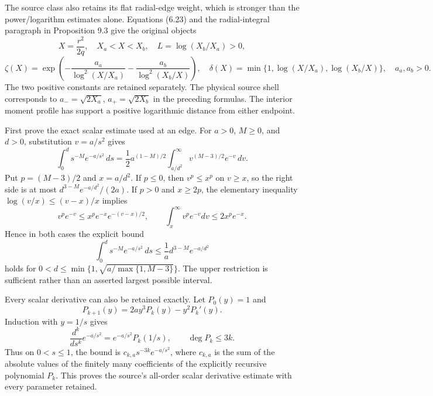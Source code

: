 \documentclass[10pt,a4paper]{article}
\begin{document}
The source class also retains its flat radial-edge weight, which is stronger than the power/logarithm estimates alone. Equations (6.23) and the radial-integral paragraph in Proposition 9.3 give the original objects \[
X=\frac{r^2}{2q},\quad X_a<X<X_b,\quad L=\log(X_b/X_a)>0,
\tag{R43}
\] \[
\zeta(X)=\exp\left(-\frac{a_a}{\log^2(X/X_a)}-\frac{a_b}{\log^2(X_b/X)}\right),
\quad\delta(X)=\min\{1,\log(X/X_a),\log(X_b/X)\},
\quad a_a,a_b>0.
\tag{R44}
\] The two positive constants are retained separately. The physical source shell corresponds to \(a_-=\sqrt{2X_a}\), \(a_+=\sqrt{2X_b}\) in the preceding formulas. The interior moment profile has support a positive logarithmic distance from either endpoint.

First prove the exact scalar estimate used at an edge. For \(a>0\), \(M\ge0\), and \(d>0\), substitution \(v=a/s^2\) gives \[
\int_0^d s^{-M}e^{-a/s^2}\,ds
=\frac12 a^{(1-M)/2}\int_{a/d^2}^\infty v^{(M-3)/2}e^{-v}\,dv.
\tag{R45}
\] Put \(p=(M-3)/2\) and \(x=a/d^2\). If \(p\le0\), then \(v^p\le x^p\) on \(v\ge x\), so the right side is at most \(d^{3-M}e^{-a/d^2}/(2a)\). If \(p>0\) and \(x\ge2p\), the elementary inequality \(\log(v/x)\le(v-x)/x\) implies \[
v^pe^{-v}\le x^pe^{-x}e^{-(v-x)/2},
\qquad \int_x^\infty v^pe^{-v}dv\le2x^pe^{-x}.
\tag{R46}
\] Hence in both cases the explicit bound \[
\int_0^d s^{-M}e^{-a/s^2}\,ds
\le\frac1a d^{3-M}e^{-a/d^2}
\tag{R47}
\] holds for \(0<d\le\min\{1,\sqrt{a/\max\{1,M-3\}}\}\). The upper restriction is sufficient rather than an asserted largest possible interval.

Every scalar derivative can also be retained exactly. Let \(P_0(y)=1\) and \[
P_{k+1}(y)=2ay^3P_k(y)-y^2P_k'(y).
\tag{R48}
\] Induction with \(y=1/s\) gives \[
\frac{d^k}{ds^k}e^{-a/s^2}=e^{-a/s^2}P_k(1/s),
\qquad\deg P_k\le3k.
\tag{R49}
\] Thus on \(0<s\le1\), the bound is \(c_{k,a}s^{-3k}e^{-a/s^2}\), where \(c_{k,a}\) is the sum of the absolute values of the finitely many coefficients of the explicitly recursive polynomial \(P_k\). This proves the source's all-order scalar derivative estimate with every parameter retained.
\end{document}
